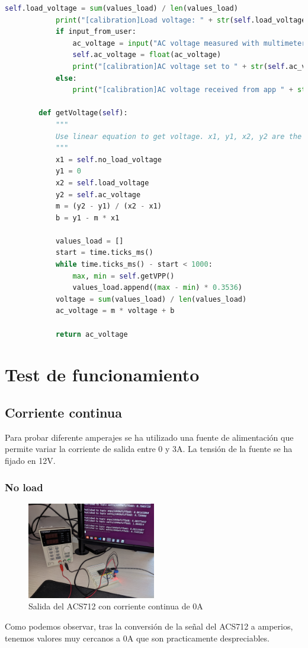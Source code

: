 \begin{titlepage}
\begin{lstlisting}[language=python]
			self.load_voltage = sum(values_load) / len(values_load)
			print("[calibration]Load voltage: " + str(self.load_voltage) + "V in " + str(end - start) + "ms")
			if input_from_user:
				ac_voltage = input("AC voltage measured with multimeter: ")
				self.ac_voltage = float(ac_voltage)
				print("[calibration]AC voltage set to " + str(self.ac_voltage) + "V")
			else:
				print("[calibration]AC voltage received from app " + str(self.ac_voltage) + "V")
		
		def getVoltage(self):
			"""
			Use linear equation to get voltage. x1, y1, x2, y2 are the points used to calculate the equation.
			"""
			x1 = self.no_load_voltage
			y1 = 0
			x2 = self.load_voltage
			y2 = self.ac_voltage
			m = (y2 - y1) / (x2 - x1)
			b = y1 - m * x1
	
			values_load = []
			start = time.ticks_ms()
			while time.ticks_ms() - start < 1000:
				max, min = self.getVPP()
				values_load.append((max - min) * 0.3536)
			voltage = sum(values_load) / len(values_load)
			ac_voltage = m * voltage + b
	
			return ac_voltage
\end{lstlisting}

\section{Test de funcionamiento}
\subsection{Corriente continua}
Para probar diferente amperajes se ha utilizado una fuente de alimentación que permite variar la corriente de salida entre 0 y 3A. La tensión de la fuente se ha fijado en 12V.\\
\subsubsection{No load}
\begin{figure}[h!]
	\centering
	\includegraphics[width=0.5\textwidth]{imagenes/DC_noload.jpg}
	\caption{Salida del ACS712 con corriente continua de 0A}
\end{figure}
Como podemos observar, tras la conversión de la señal del ACS712 a amperios, tenemos valores muy cercanos a 0A que son practicamente despreciables. \\

\end{titlepage}
